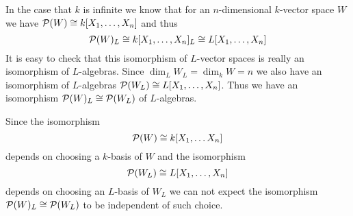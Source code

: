 In the case that $k$ is infinite we know that for an $n$-dimensional $k$-vector space $W$ we have $\mathcal{P}(W) \cong k[X_1, \dotsc, X_n]$ and thus
\[
 \mathcal{P}(W)_L \cong k[X_1, \dotsc, X_n]_L \cong L[X_1, \dotsc, X_n]
\]
It is easy to check that this isomorphism of $L$-vector spaces is really an isomorphism of $L$-algebras. Since $\dim_L W_L = \dim_k W = n$ we also have an isomorphism of $L$-algebras $\mathcal{P}(W_L) \cong L[X_1, \dotsc, X_n]$. Thus we have an isomorphism $\mathcal{P}(W)_L \cong \mathcal{P}(W_L)$ of $L$-algebras.

Since the isomorphism
\[
 \mathcal{P}(W) \cong k[X_1, \dotsc X_n]
\]
depends on choosing a $k$-basis of $W$ and the isomorphism
\[
 \mathcal{P}(W_L) \cong L[X_1, \dotsc, X_n]
\]
depends on choosing an $L$-basis of $W_L$ we can not expect the isomorphism $\mathcal{P}(W)_L \cong \mathcal{P}(W_L)$ to be independent of such choice.




















